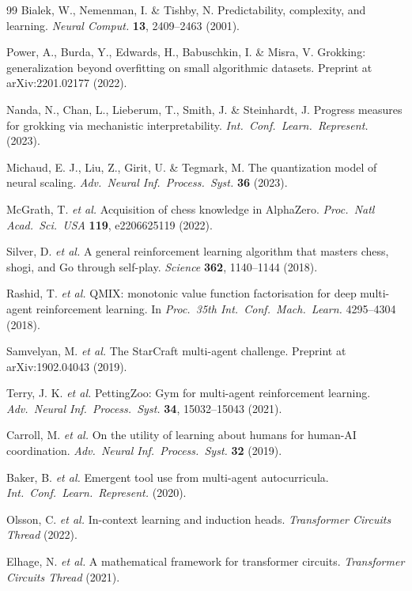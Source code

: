 \documentclass[11pt]{article}
\theoremstyle{definition}
\begin{document}
\begin{thebibliography}{99}
 Bialek, W., Nemenman, I. \& Tishby, N.
Predictability, complexity, and learning. \emph{Neural Comput.}
\textbf{13}, 2409--2463 (2001).

 Power, A., Burda, Y., Edwards, H., Babuschkin, I.
\& Misra, V. Grokking: generalization beyond overfitting on small
algorithmic datasets. Preprint at arXiv:2201.02177 (2022).

 Nanda, N., Chan, L., Lieberum, T., Smith, J. \&
Steinhardt, J. Progress measures for grokking via mechanistic
interpretability. \emph{Int.\ Conf.\ Learn.\ Represent.} (2023).

 Michaud, E. J., Liu, Z., Girit, U. \& Tegmark, M.
The quantization model of neural scaling. \emph{Adv.\ Neural Inf.\
Process.\ Syst.} \textbf{36} (2023).

 McGrath, T. \emph{et al.} Acquisition of chess
knowledge in AlphaZero. \emph{Proc.\ Natl Acad.\ Sci.\ USA}
\textbf{119}, e2206625119 (2022).

 Silver, D. \emph{et al.} A general reinforcement
learning algorithm that masters chess, shogi, and Go through self-play.
\emph{Science} \textbf{362}, 1140--1144 (2018).

 Rashid, T. \emph{et al.} QMIX: monotonic value
function factorisation for deep multi-agent reinforcement learning. In
\emph{Proc.\ 35th Int.\ Conf.\ Mach.\ Learn.} 4295--4304 (2018).

 Samvelyan, M. \emph{et al.} The StarCraft
multi-agent challenge. Preprint at arXiv:1902.04043 (2019).

 Terry, J. K. \emph{et al.} PettingZoo: Gym for
multi-agent reinforcement learning. \emph{Adv.\ Neural Inf.\ Process.\
Syst.} \textbf{34}, 15032--15043 (2021).

 Carroll, M. \emph{et al.} On the utility of
learning about humans for human-AI coordination. \emph{Adv.\ Neural
Inf.\ Process.\ Syst.} \textbf{32} (2019).

 Baker, B. \emph{et al.} Emergent tool use from
multi-agent autocurricula. \emph{Int.\ Conf.\ Learn.\ Represent.}
(2020).

 Olsson, C. \emph{et al.} In-context learning and
induction heads. \emph{Transformer Circuits Thread} (2022).

 Elhage, N. \emph{et al.} A mathematical framework
for transformer circuits. \emph{Transformer Circuits Thread} (2021).


\end{thebibliography}
\end{document}
